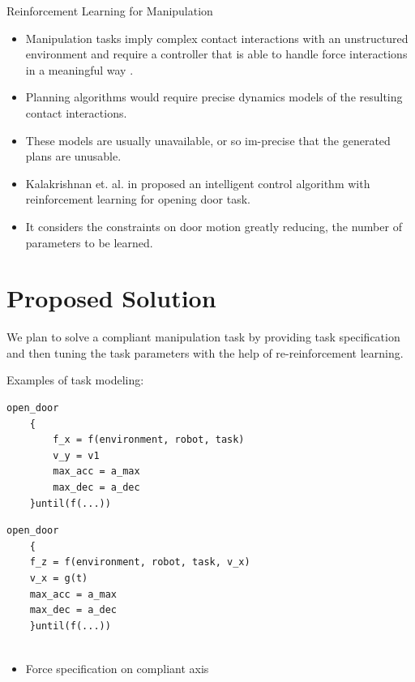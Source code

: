 \documentclass[10pt]{beamer}
\begin{document}
\begin{frame}{Reinforcement Learning for Manipulation}
	\begin{itemize}
		\item Manipulation tasks imply complex contact interactions with an unstructured environment and require a controller that is able to handle force interactions in a meaningful way \cite{kalakrishnan2011learning}.
		\item Planning algorithms would require precise dynamics models of the resulting contact interactions. 
		\item These models are usually unavailable, or so im-precise that the generated plans are unusable\cite{kalakrishnan2011learning}. 
		\item Kalakrishnan et. al. in \cite{kalakrishnan2011learning} proposed an intelligent control algorithm with reinforcement learning for opening door task.
		\item It considers the constraints on door motion greatly reducing, the number of parameters to be learned. 
	\end{itemize}
\end{frame}

\section{Proposed Solution}
\begin{frame}[fragile]
	We plan to solve a compliant manipulation task by providing task specification and then tuning the task parameters with the help of re-reinforcement learning.
	
	Examples of task modeling: 
	
	\begin{lstlisting}[label=open_door_ts,caption=Task specification for opening door]
	open_door
	{
		f_x = f(environment, robot, task)
		v_y = v1
		max_acc = a_max
		max_dec = a_dec
	}until(f(...))

	\end{lstlisting}
	
\end{frame}

\begin{frame}[fragile]
	
	\begin{lstlisting}[label=open_door_ts,caption=Task specification for cutting vegetables]
	open_door
	{
	f_z = f(environment, robot, task, v_x)
	v_x = g(t)
	max_acc = a_max
	max_dec = a_dec
	}until(f(...))
	
	\end{lstlisting}
	\begin{itemize}
		\item Force specification on compliant axis
	\end{itemize}
\end{frame}
\end{document}
